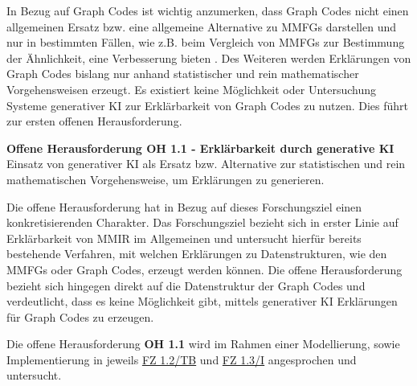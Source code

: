 In Bezug auf Graph Codes ist wichtig anzumerken, dass Graph Codes nicht einen allgemeinen Ersatz bzw. eine allgemeine Alternative zu MMFGs darstellen und nur in bestimmten Fällen, wie z.B. beim Vergleich von MMFGs zur Bestimmung der Ähnlichkeit, eine Verbesserung bieten \cite{gc-2d-proj-mmfg}.
Des Weiteren werden Erklärungen von Graph Codes bislang nur anhand statistischer und rein mathematischer Vorgehensweisen erzeugt.
Es existiert keine Möglichkeit oder Untersuchung Systeme generativer KI zur Erklärbarkeit von Graph Codes zu nutzen.
Dies führt zur ersten offenen Herausforderung.

\begin{tcolorbox}[minipage, colback=white, colframe=black, arc=0pt, outer arc=0pt]
    \textbf{Offene Herausforderung OH 1.1 - Erklärbarkeit durch generative KI} \\
    Einsatz von generativer KI als Ersatz bzw. Alternative zur statistischen und rein mathematischen Vorgehensweise, um Erklärungen zu generieren.
\end{tcolorbox}

Die offene Herausforderung  hat in Bezug auf dieses Forschungsziel einen konkretisierenden Charakter.
Das Forschungsziel bezieht sich in erster Linie auf Erklärbarkeit von MMIR im Allgemeinen und untersucht hierfür bereits bestehende Verfahren, mit welchen Erklärungen zu Datenstrukturen, wie den MMFGs oder Graph Codes, erzeugt werden können.
Die offene Herausforderung bezieht sich hingegen direkt auf die Datenstruktur der Graph Codes und verdeutlicht, dass es keine Möglichkeit gibt, mittels generativer KI Erklärungen für Graph Codes zu erzeugen.

Die offene Herausforderung \textbf{OH 1.1} wird im Rahmen einer Modellierung, sowie Implementierung in jeweils \hyperref[sec3:model:subsec:fz-explainability]{FZ 1.2/TB} und \hyperref[sec4:impl:subsec:fz-explainability]{FZ 1.3/I} angesprochen und untersucht.

